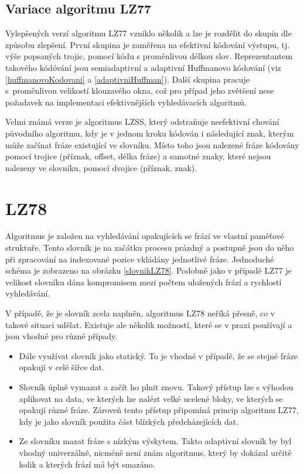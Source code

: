 \subsection{Variace algoritmu LZ77}
Vylepšených verzí algoritmu LZ77 vzniklo několik a lze je rozdělit do skupin dle způsobu zlepšení. První skupina je zaměřena na efektivní kódování výstupu, tj. výše popsaných trojic, pomocí kódu s proměnlivou délkou slov. Reprezentantem takového kódóvání jsou semiadaptivní a adaptivní Huffmanovo kódování (viz \ref{huffmanovoKodovani} a \ref{adaptivniHuffman}). Další skupina pracuje s~proměnlivou velikostí klouzavého okna, což pro případ jeho zvětšení nese požadavek na implementaci efektivnějších vyhledávacích algoritmů.

Velmi známá verze je algoritmus LZSS, který odstraňuje neefektivní chování původního algoritmu, kdy je v jednom kroku kódován i následující znak, kterým může začínat fráze existující ve slovníku. Místo toho jsou nalezené fráze kódovány pomocí trojice (příznak, offset, délka fráze) a samotné znaky, které nejsou nalezeny ve slovníku, pomocí dvojice (příznak, znak).

\section{LZ78}
Algoritmus je založen na vyhledávání opakujících se frází ve vlastní paměťové struktuře. Tento slovník je na začátku procesu prázdný a postupně jsou do něho při zpracování na indexované pozice vkládány jednotlivé fráze. Jednoduché schéma je zobrazeno na obrázku \ref{slovnikLZ78}. Podobně jako v případě LZ77 je velikost slovníku dána kompromisem mezi počtem uložených frází a rychlostí vyhledávání.

V případě, že je slovník zcela naplněn, algoritmus LZ78 neříká přesně, co v takové situaci udělat. Existuje ale několik možností, které se v praxi používají a jsou vhodné pro různé případy.

\begin{itemize}
\item Dále využívat slovník jako statický. To je vhodné v případě, že se stejné fráze opakují v celé šířce dat.
\item Slovník úplně vymazat a začít ho plnit znovu. Takový přístup lze s výhodou aplikovat na data, ve kterých lze nalézt velké ucelené bloky, ve kterých se opakují různé fráze. Zároveň tento přístup připomíná princip algoritmu LZ77, kdy je jako slovník použita část blízkých předcházejících dat.
\item Ze slovníku mazat fráze s nízkým výskytem. Takto adaptivní slovník by byl vhodný univerzálně, nicméně není znám algoritmus, který by dokázal určitě kolik a kterých frází má být smazáno.
\end{itemize}

